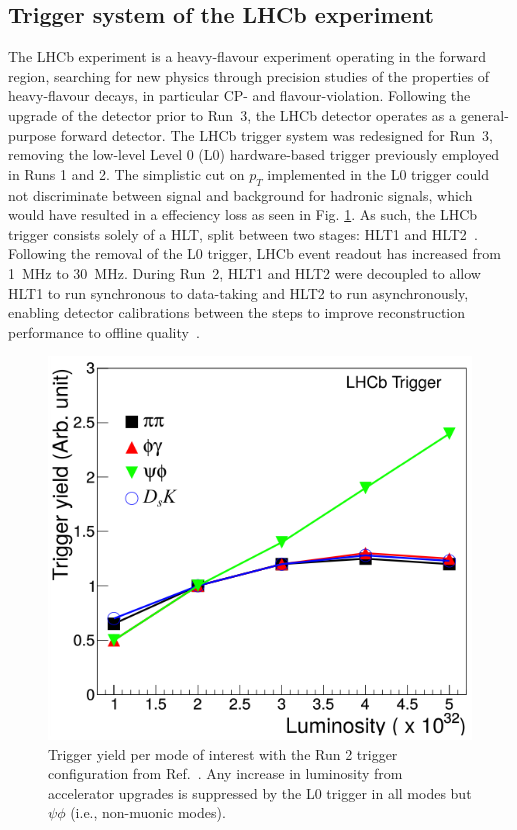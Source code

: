 \subsection{Trigger system of the LHCb experiment}

The LHCb experiment is a heavy-flavour experiment operating in the forward region, searching for new physics through precision studies of the properties of heavy-flavour decays, in particular CP- and flavour-violation. Following the upgrade of the detector prior to Run~3, the LHCb detector operates as a general-purpose forward detector. The LHCb trigger system was redesigned for Run~3, removing the low-level Level 0 (L0) hardware-based trigger previously employed in Runs 1 and 2. The simplistic cut on $p_{T}$ implemented in the L0 trigger could not discriminate between signal and background for hadronic signals, which would have resulted in a effeciency loss as seen in Fig. \ref{fig:LHCbL0TriggerYield}. As such, the LHCb trigger consists solely of a HLT, split between two stages: HLT1 and HLT2~\cite{Aaij:2019uij}. Following the removal of the L0 trigger, LHCb event readout has increased from \SI{1}{\mega\hertz} to \SI{30}{\mega\hertz}. During Run~2, HLT1 and HLT2 were decoupled to allow HLT1 to run synchronous to data-taking and HLT2 to run asynchronously, enabling  detector calibrations between the steps to improve reconstruction performance to offline quality~\cite{LHCb:Albrecht_2015}. 

\begin{figure}[h!]
    \centering
    \includegraphics[width=0.55\linewidth]{images/lhcb/LHCb-L0-yield.png}
    \caption{Trigger yield per mode of interest with the Run 2 trigger configuration from Ref.~\cite{LHCb:upgrade-piucci}. Any increase in luminosity from accelerator upgrades is suppressed by the L0 trigger in all modes but $\psi\phi$ (i.e., non-muonic modes).}
    \label{fig:LHCbL0TriggerYield}
\end{figure}


